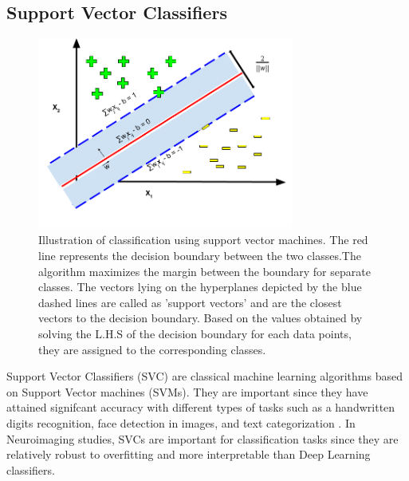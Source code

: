 \documentclass[msthesis.tex]{subfiles}
\begin{document}
\subsection{Support Vector Classifiers}
\begin{figure}
    \label{fig:svm}
    \centering
    \includegraphics[width=0.75\textwidth]{images/SVM.png}
    \caption{Illustration of classification using support vector machines. The red line represents the decision boundary between the two classes.The algorithm maximizes the margin between the boundary for separate classes. The vectors lying on the hyperplanes depicted by the blue dashed lines are called as 'support vectors' and are the closest vectors to the decision boundary. Based on the values obtained by solving the L.H.S of the decision boundary for each data points, they are assigned to the corresponding classes.}
    \label{fig:my_label}
\end{figure}

Support Vector Classifiers (SVC) are classical machine learning algorithms based on Support Vector machines (SVMs). They are important since they have attained signifcant accuracy with different types of tasks such as a handwritten digits recognition, face detection in images, and text categorization \cite{burges1998a}. In Neuroimaging studies, SVCs are important for classification tasks since they are relatively robust to overfitting and more interpretable than Deep Learning classifiers.
\end{document}
